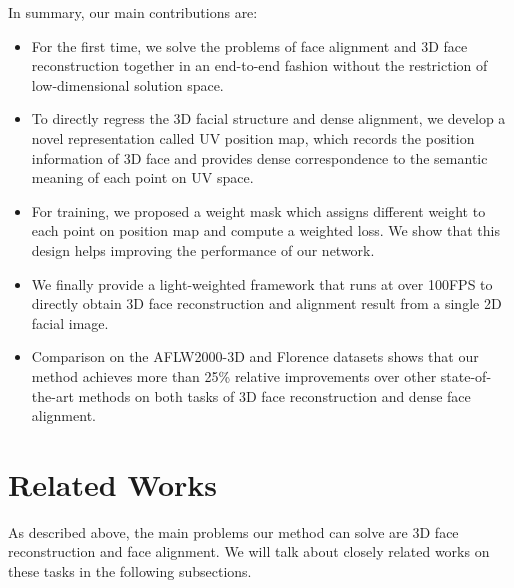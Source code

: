 \documentclass[runningheads]{llncs}
\begin{document}
In summary, our main contributions are:
\begin{itemize}
\item For the first time, we solve the problems of  face alignment and 3D face reconstruction together in an end-to-end fashion without the restriction of low-dimensional solution space.
\item To directly regress the 3D facial structure and dense alignment, we develop a novel representation called UV position map, which records the position information of 3D face and provides dense correspondence to the semantic meaning of each point on UV space.
\item For training, we proposed a weight mask which assigns different weight to each point on position map and compute a weighted loss. We show that this design helps improving the performance of our network. 
\item We finally provide a light-weighted framework that runs at over 100FPS to directly obtain 3D face reconstruction and alignment result from a single 2D facial image.
\item Comparison on the AFLW2000-3D and Florence datasets shows that 
our method achieves more than 25\% relative improvements over other state-of-the-art methods on both tasks of 3D face reconstruction and dense face alignment.
\end{itemize}


\section{Related Works}
As described above, the main problems our method can solve are 3D face reconstruction and face alignment. We will talk about closely related works on these tasks in the following subsections.
\end{document}
